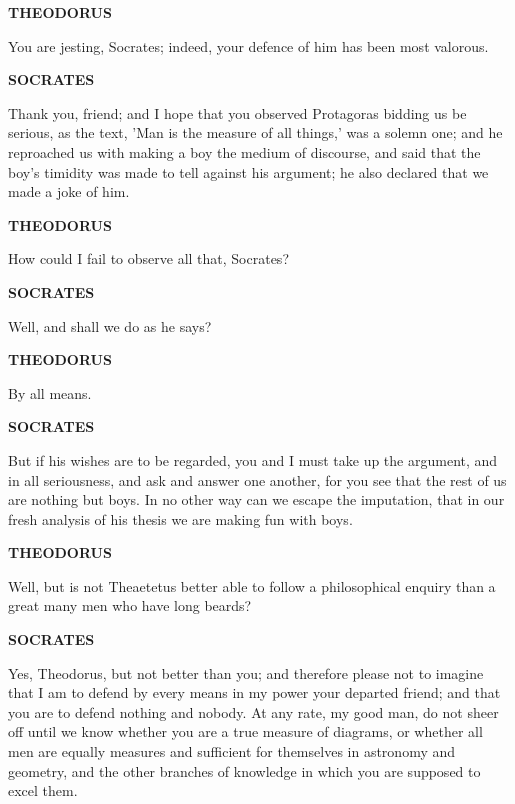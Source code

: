\documentclass[11pt,letter]{article}
\begin{document}
\par \textbf{THEODORUS}
\par   You are jesting, Socrates; indeed, your defence of him has been most valorous.

\par \textbf{SOCRATES}
\par   Thank you, friend; and I hope that you observed Protagoras bidding us be serious, as the text, 'Man is the measure of all things,' was a solemn one; and he reproached us with making a boy the medium of discourse, and said that the boy's timidity was made to tell against his argument; he also declared that we made a joke of him.

\par \textbf{THEODORUS}
\par   How could I fail to observe all that, Socrates?

\par \textbf{SOCRATES}
\par   Well, and shall we do as he says?

\par \textbf{THEODORUS}
\par   By all means.

\par \textbf{SOCRATES}
\par   But if his wishes are to be regarded, you and I must take up the argument, and in all seriousness, and ask and answer one another, for you see that the rest of us are nothing but boys. In no other way can we escape the imputation, that in our fresh analysis of his thesis we are making fun with boys.

\par \textbf{THEODORUS}
\par   Well, but is not Theaetetus better able to follow a philosophical enquiry than a great many men who have long beards?

\par \textbf{SOCRATES}
\par   Yes, Theodorus, but not better than you; and therefore please not to imagine that I am to defend by every means in my power your departed friend; and that you are to defend nothing and nobody. At any rate, my good man, do not sheer off until we know whether you are a true measure of diagrams, or whether all men are equally measures and sufficient for themselves in astronomy and geometry, and the other branches of knowledge in which you are supposed to excel them.
\end{document}
